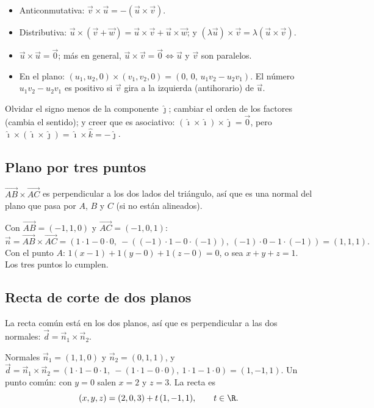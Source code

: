 \documentclass[11pt,a4paper]{article}
\let\nivelbase\nivel
\renewcommand{\nivel}[2]{\Needspace{8\baselineskip}\nivelbase{#1}{#2}}
\newcommand{\ii}{\hat{\imath}}\newcommand{\jj}{\hat{\jmath}}\newcommand{\kk}{\hat{k}}
\newcommand{\vu}{\vec{u}}\def\vv{\vec{v}}\newcommand{\vw}{\vec{w}}\newcommand{\vn}{\vec{n}}
\begin{document}
\begin{propiedad}
\begin{itemize}
\item Anticonmutativa: $\vv\times\vu=-\left(\vu\times\vv\right)$.
\item Distributiva: $\vu\times(\vv+\vw)=\vu\times\vv+\vu\times\vw$; y $(\lambda\vu)\times\vv=\lambda\left(\vu\times\vv\right)$.
\item $\vu\times\vu=\vec0$; más en general, $\vu\times\vv=\vec 0\iff\vu$ y $\vv$ son paralelos.
\item En el plano: $(u_1,u_2,0)\times(v_1,v_2,0)=\left(0,\,0,\,u_1v_2-u_2v_1\right)$. El número $u_1v_2-u_2v_1$ es
      positivo si $\vv$ gira a la izquierda (antihorario) de $\vu$.
\end{itemize}
\end{propiedad}
\begin{ojo}
Olvidar el signo menos de la componente $\jj$; cambiar el orden de los factores (cambia el sentido); y creer que
es asociativo: $(\ii\times\ii)\times\jj=\vec0$, pero $\ii\times(\ii\times\jj)=\ii\times\kk=-\jj$.
\end{ojo}


\subsection{Plano por tres puntos}
$\overrightarrow{AB}\times\overrightarrow{AC}$ es perpendicular a los dos lados del triángulo, así que es una
normal del plano que pasa por $A$, $B$ y $C$ (si no están alineados).
\begin{ejemplo}
Con $\overrightarrow{AB}=(-1,1,0)$ y $\overrightarrow{AC}=(-1,0,1)$:
\[ \vn=\overrightarrow{AB}\times\overrightarrow{AC}=\left(1\cdot1-0\cdot0,\ -\left((-1)\cdot1-0\cdot(-1)\right),\ (-1)\cdot0-1\cdot(-1)\right)=(1,1,1). \]
Con el punto $A$: $1(x-1)+1(y-0)+1(z-0)=0$, o sea $x+y+z=1$. Los tres puntos lo cumplen.
\end{ejemplo}

\subsection{Recta de corte de dos planos}
La recta común está en los dos planos, así que es perpendicular a las dos normales:
$\vec d=\vn_1\times\vn_2$.
\begin{ejemplo}[Los planos $x+y=2$ y $y+z=3$]
Normales $\vn_1=(1,1,0)$ y $\vn_2=(0,1,1)$, y
$\vec d=\vn_1\times\vn_2=\left(1\cdot1-0\cdot1,\ -\left(1\cdot1-0\cdot0\right),\ 1\cdot1-1\cdot0\right)=(1,-1,1)$.
Un punto común: con $y=0$ salen $x=2$ y $z=3$. La recta es
\[ (x,y,z)=(2,0,3)+t\,(1,-1,1),\qquad t\in\R . \]
\end{ejemplo}
\end{document}
